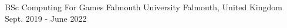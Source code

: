 \begin{cventries}
  \cventry
    {BSc Computing For Games} %
    {Falmouth University} %
    {Falmouth, United Kingdom} %
    {Sept. 2019 - June 2022} %
    {
    }
\end{cventries}